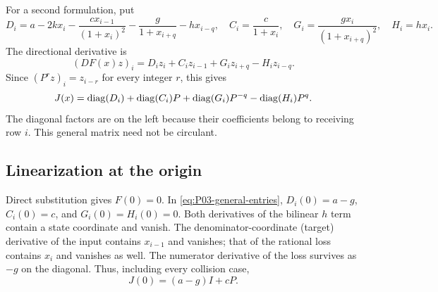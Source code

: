 For a second formulation, put
\[
 D_i=a-2kx_i-\frac{c x_{i-1}}{(1+x_i)^2}
            -\frac{g}{1+x_{i+q}}-h x_{i-q},\quad
 C_i=\frac{c}{1+x_i},\quad
 G_i=\frac{g x_i}{(1+x_{i+q})^2},\quad H_i=h x_i.
\]
The directional derivative is
\begin{equation}
 (DF(x)z)_i=D_i z_i+C_i z_{i-1}+G_i z_{i+q}-H_i z_{i-q}.
 \label{eq:P03-directional}
\end{equation}
Since $(P^r z)_i=z_{i-r}$ for every integer $r$, this gives
\begin{equation}
 J(x)=\operatorname{diag}(D_i)+\operatorname{diag}(C_i)P+\operatorname{diag}(G_i)P^{-q}
                           -\operatorname{diag}(H_i)P^q.
 \label{eq:P03-variable-matrix}
\end{equation}
The diagonal factors are on the left because their coefficients
belong to receiving row $i$. This general matrix need not be circulant.

\subsection{Linearization at the origin}
\label{slot:P03-1}

Direct substitution gives $F(0)=0$. In
\eqref{eq:P03-general-entries}, $D_i(0)=a-g$, $C_i(0)=c$, and
$G_i(0)=H_i(0)=0$. Both derivatives of the bilinear $h$ term
contain a state coordinate and vanish. The denominator-coordinate
(target) derivative of the input contains $x_{i-1}$ and vanishes;
that of the rational loss contains $x_i$ and vanishes as well.
The numerator derivative of the loss survives as $-g$ on the
 diagonal. Thus, including every collision case,
\begin{equation}
 \boxed{J(0)=(a-g)I+cP.}
 \label{eq:P03-origin-jacobian}
\end{equation}

